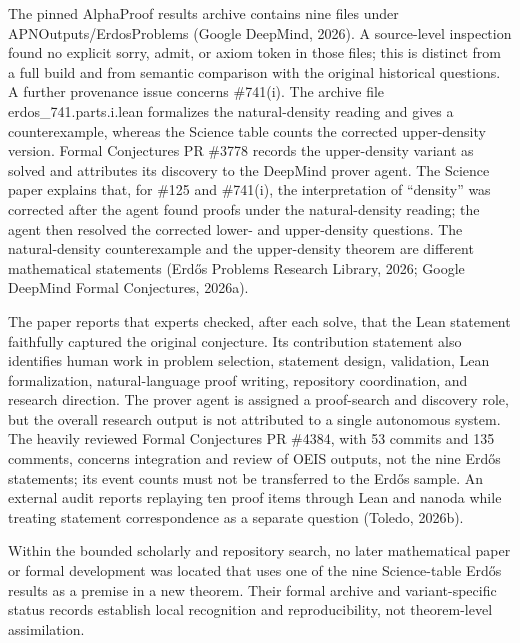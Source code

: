 \documentclass[sn-apa]{sn-jnl}
\begin{document}
The pinned AlphaProof results archive contains nine files under APNOutputs/ErdosProblems (Google DeepMind, 2026). A source-level inspection found no explicit sorry, admit, or axiom token in those files; this is distinct from a full build and from semantic comparison with the original historical questions. A further provenance issue concerns \#741(i). The archive file erdos\_741.parts.i.lean formalizes the natural-density reading and gives a counterexample, whereas the Science table counts the corrected upper-density version. Formal Conjectures PR \#3778 records the upper-density variant as solved and attributes its discovery to the DeepMind prover agent. The Science paper explains that, for \#125 and \#741(i), the interpretation of “density” was corrected after the agent found proofs under the natural-density reading; the agent then resolved the corrected lower- and upper-density questions. The natural-density counterexample and the upper-density theorem are different mathematical statements (Erdős Problems Research Library, 2026; Google DeepMind Formal Conjectures, 2026a).

The paper reports that experts checked, after each solve, that the Lean statement faithfully captured the original conjecture. Its contribution statement also identifies human work in problem selection, statement design, validation, Lean formalization, natural-language proof writing, repository coordination, and research direction. The prover agent is assigned a proof-search and discovery role, but the overall research output is not attributed to a single autonomous system. The heavily reviewed Formal Conjectures PR \#4384, with 53 commits and 135 comments, concerns integration and review of OEIS outputs, not the nine Erdős statements; its event counts must not be transferred to the Erdős sample. An external audit reports replaying ten proof items through Lean and nanoda while treating statement correspondence as a separate question (Toledo, 2026b).

Within the bounded scholarly and repository search, no later mathematical paper or formal development was located that uses one of the nine Science-table Erdős results as a premise in a new theorem. Their formal archive and variant-specific status records establish local recognition and reproducibility, not theorem-level assimilation.
\end{document}
